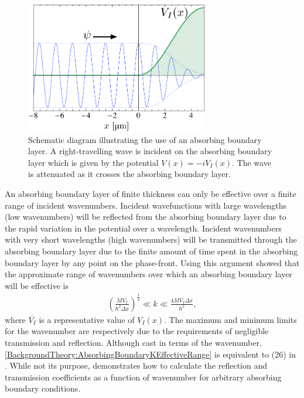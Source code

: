 \begin{figure}
    \centering
    \includegraphics[width=8cm]{AbsorbingBoundarySchematic}
    \caption{
        \label{BackgroundTheory:AbsorbingBoundarySchematic}
        Schematic diagram illustrating the use of an absorbing boundary layer. A right-travelling wave is incident on the absorbing boundary layer which is given by the potential $V(x) = -i V_I(x)$. The wave is attenuated as it crosses the absorbing boundary layer.
    }
\end{figure}

An absorbing boundary layer of finite thickness can only be effective over a finite range of incident wavenumbers. Incident wavefunctions with large wavelengths (low wavenumbers) will be reflected from the absorbing boundary layer due to the rapid variation in the potential over a wavelength. Incident wavenumbers with very short wavelengths (high wavenumbers) will be transmitted through the absorbing boundary layer due to the finite amount of time spent in the absorbing boundary layer by any point on the phase-front.  Using this argument \citet{Neuhasuer:1989} showed that the approximate range of wavenumbers over which an absorbing boundary layer will be effective is
\begin{align}
    \label{BackgroundTheory:AbsorbingBoundaryKEffectiveRange}
    \left( \frac{M \overline{V_I}}{\hbar^2 \Delta x}\right)^{\frac{1}{3}} \ll k \ll \frac{4 M \overline{V_I} \Delta x}{\hbar^2},
\end{align}
where $\overline{V_I}$ is a representative value of $V_I(x)$. The maximum and minimum limits for the wavenumber are respectively due to the requirements of negligible transmission and reflection. Although cast in terms of the wavenumber, \eqref{BackgroundTheory:AbsorbingBoundaryKEffectiveRange} is equivalent to (26) in \citep{Neuhasuer:1989}. While not its purpose,  demonstrates how to calculate the reflection and transmission coefficients as a function of wavenumber for arbitrary absorbing boundary conditions.

